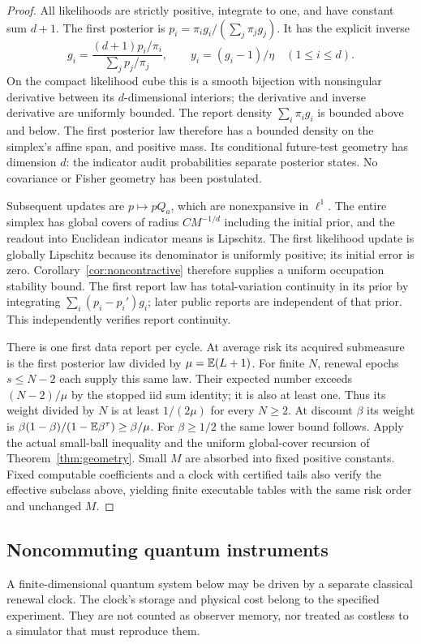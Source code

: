 \begin{proof}
All likelihoods are strictly positive, integrate to one, and have constant sum $d+1$. The first posterior is
$p_i=\pi_i g_i/(\sum_j\pi_jg_j)$. It has the explicit inverse
\[
 g_i=\frac{(d+1)p_i/\pi_i}{\sum_jp_j/\pi_j},\qquad
 y_i=(g_i-1)/\eta\quad(1\le i\le d).
\]
On the compact likelihood cube this is a smooth bijection with nonsingular derivative between its $d$-dimensional interiors; the derivative and inverse derivative are uniformly bounded. The report density $\sum_i\pi_i g_i$ is bounded above and below. The first posterior law therefore has a bounded density on the simplex's affine span, and positive mass. Its conditional future-test geometry has dimension $d$: the indicator audit probabilities separate posterior states. No covariance or Fisher geometry has been postulated.

Subsequent updates are $p\mapsto pQ_a$, which are nonexpansive in $\ell^1$. The entire simplex has global covers of radius $C M^{-1/d}$ including the initial prior, and the readout into Euclidean indicator means is Lipschitz. The first likelihood update is globally Lipschitz because its denominator is uniformly positive; its initial error is zero. Corollary~\ref{cor:noncontractive} therefore supplies a uniform occupation stability bound. The first report law has total-variation continuity in its prior by integrating $\sum_i(p_i-p_i')g_i$; later public reports are independent of that prior. This independently verifies report continuity.

There is one first data report per cycle. At average risk its acquired submeasure is the first posterior law divided by $\mu=\mathbb E(L+1)$. For finite $N$, renewal epochs $s\le N-2$ each supply this same law. Their expected number exceeds $(N-2)/\mu$ by the stopped iid sum identity; it is also at least one. Thus its weight divided by $N$ is at least $1/(2\mu)$ for every $N\ge2$. At discount $\beta$ its weight is
$\beta(1-\beta)/(1-\mathbb E\beta^\tau)\ge\beta/\mu$.
For $\beta\ge1/2$ the same lower bound follows. Apply the actual small-ball inequality and the uniform global-cover recursion of Theorem~\ref{thm:geometry}. Small $M$ are absorbed into fixed positive constants. Fixed computable coefficients and a clock with certified tails also verify the effective subclass above, yielding finite executable tables with the same risk order and unchanged $M$.
\end{proof}

\subsection{Noncommuting quantum instruments}
A finite-dimensional quantum system below may be driven by a separate classical renewal clock. The clock's storage and physical cost belong to the specified experiment. They are not counted as observer memory, nor treated as costless to a simulator that must reproduce them.


